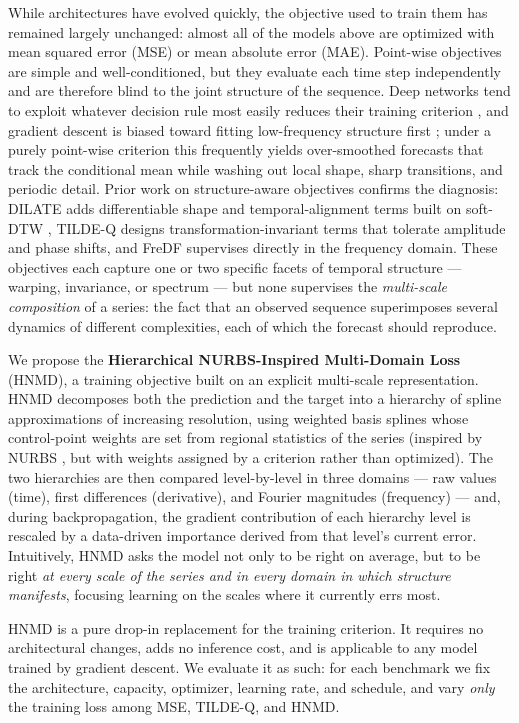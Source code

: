 \documentclass[11pt,twocolumn]{article}
\newcommand{\methodName}{HNMD\xspace}
\begin{document}
While architectures have evolved quickly, the objective used to train them has remained largely unchanged: almost all of the models above are optimized with mean squared error (MSE) or mean absolute error (MAE). Point-wise objectives are simple and well-conditioned, but they evaluate each time step independently and are therefore blind to the joint structure of the sequence. Deep networks tend to exploit whatever decision rule most easily reduces their training criterion \citep{shortcut}, and gradient descent is biased toward fitting low-frequency structure first \citep{spectralbias}; under a purely point-wise criterion this frequently yields over-smoothed forecasts that track the conditional mean while washing out local shape, sharp transitions, and periodic detail. Prior work on structure-aware objectives confirms the diagnosis: DILATE \citep{dilate} adds differentiable shape and temporal-alignment terms built on soft-DTW \citep{softdtw}, TILDE-Q \citep{tilde-q} designs transformation-invariant terms that tolerate amplitude and phase shifts, and FreDF \citep{fredf} supervises directly in the frequency domain. These objectives each capture one or two specific facets of temporal structure --- warping, invariance, or spectrum --- but none supervises the \emph{multi-scale composition} of a series: the fact that an observed sequence superimposes several dynamics of different complexities, each of which the forecast should reproduce.

We propose the \textbf{Hierarchical NURBS-Inspired Multi-Domain Loss} (\methodName), a training objective built on an explicit multi-scale representation. \methodName decomposes both the prediction and the target into a hierarchy of spline approximations of increasing resolution, using weighted basis splines whose control-point weights are set from regional statistics of the series (inspired by NURBS \citep{piegl}, but with weights assigned by a criterion rather than optimized). The two hierarchies are then compared level-by-level in three domains --- raw values (time), first differences (derivative), and Fourier magnitudes (frequency) --- and, during backpropagation, the gradient contribution of each hierarchy level is rescaled by a data-driven importance derived from that level's current error. Intuitively, \methodName asks the model not only to be right on average, but to be right \emph{at every scale of the series and in every domain in which structure manifests}, focusing learning on the scales where it currently errs most.

\methodName is a pure drop-in replacement for the training criterion. It requires no architectural changes, adds no inference cost, and is applicable to any model trained by gradient descent. We evaluate it as such: for each benchmark we fix the architecture, capacity, optimizer, learning rate, and schedule, and vary \emph{only} the training loss among MSE, TILDE-Q, and \methodName.
\end{document}

